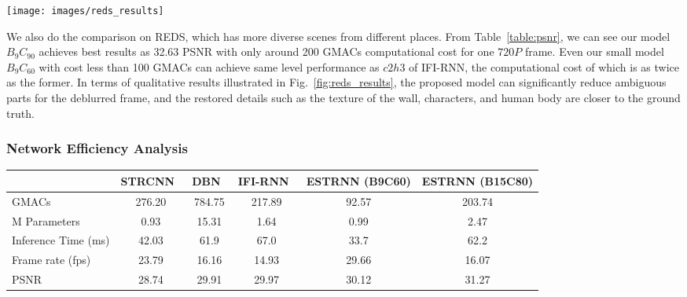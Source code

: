 \documentclass[twocolumn]{svjour3}          \smartqed  \usepackage{graphicx}
\begin{document}
\begin{figure*}[!t]
	\centering
	\texttt{[image: images/reds\_results]}
	\caption{Visual comparisons on REDS~\cite{nah2019ntire}.}
	\label{fig:reds_results}
\end{figure*}

We also do the comparison on REDS, which has more diverse scenes from different places. From Table~\ref{table:psnr}, we can see our model $B_9C_{90}$ achieves best results as 32.63 PSNR with only around 200 GMACs computational cost for one $720P$ frame. Even our small model $B_9C_{60}$ with cost less than 100 GMACs can achieve same level performance as $c2h3$ of IFI-RNN, the computational cost of which is as twice as the former. In terms of qualitative results illustrated in Fig.~\ref{fig:reds_results}, the proposed model can significantly reduce ambiguous parts for the deblurred frame, and the restored details such as the texture of the wall, characters, and human body are closer to the ground truth.

\subsubsection{Network Efficiency Analysis}
\begin{table*}[ht]
  \caption{Computational cost and inference time comparison. We show the performance of each model in terms of GMACs, Million parameters, inference time (ms), frame rate (fps), and the corresponding PSNR score. The size of test image is 1280$\times$720, and the test hardware is GeForce RTX 2080 Ti. The average value is reported.}
  \label{tab:cost_comparison}
  \centering
  \begin{tabular}{lccccc}
    \toprule
    & STRCNN~\cite{hyun2017online} & DBN~\cite{su2017deep} & IFI-RNN~\cite{nah2019recurrent} & ESTRNN (B9C60) & ESTRNN (B15C80)\\
    \midrule
    GMACs & 276.20 & 784.75 & 217.89 & 92.57 & 203.74\\
    M Parameters& 0.93 & 15.31 & 1.64 & 0.99 & 2.47\\
    Inference Time (ms) & 42.03 & 61.9 & 67.0 & 33.7 & 62.2\\
    Frame rate (fps) & 23.79 & 16.16 & 14.93 & 29.66 & 16.07\\
    PSNR & 28.74 & 29.91 & 29.97 & 30.12 & 31.27 \\
    \bottomrule
  \end{tabular}
\end{table*}
\end{document}
